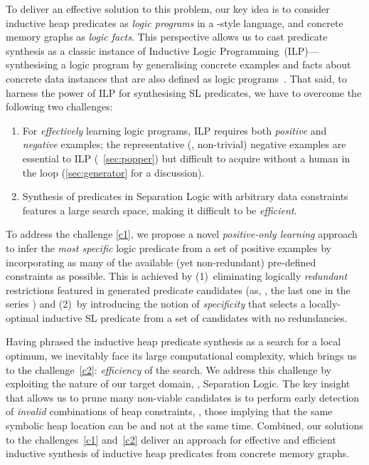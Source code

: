 To deliver an effective solution to this problem, our key idea is to
consider inductive heap predicates as \emph{logic programs} in a
\prolog-style language, and concrete memory graphs as \emph{logic
  facts}.
%
This perspective allows us to cast predicate synthesis as a classic
instance of Inductive Logic Programming~(ILP)---synthesising a logic
program by generalising concrete examples and facts about concrete
data instances that are also defined as logic
programs~\cite{Muggleton91,CropperDEM22}.
%
That said, to harness the power of ILP for synthesising SL predicates,
we have to overcome the following two challenges:

\begin{enumerate}[label=\textbf{C\arabic*},topsep=2pt,leftmargin=17pt]
%
\item \label{c1} For \emph{effectively} learning logic programs, ILP
  requires both \emph{positive} and \emph{negative} examples; the
  representative (\ie, non-trivial) negative examples are essential to
  ILP (\cf~\autoref{sec:popper}) but difficult to acquire without a
  human in the loop (\cf \autoref{sec:generator} for a discussion).
%
\item \label{c2} Synthesis of predicates in Separation Logic with
  arbitrary data constraints features a large search space, making it
  difficult to be \emph{efficient}.
%
\end{enumerate}

\noindent
%
To address the challenge \ref{c1}, we propose a novel
\textit{positive-only learning} approach to infer the \emph{most
  specific} logic predicate from a set of positive examples by
incorporating as many of the available (yet non-redundant) pre-defined
constraints as possible.
%
This is achieved by (1)~eliminating logically \emph{redundant}
restrictions featured in generated predicate candidates (as, \eg, the
last one in the series ) and
%
(2)~by introducing the notion of \emph{specificity} that selects a
locally-optimal inductive SL predicate from a set
of candidates with no redundancies.

Having phrased the inductive heap predicate synthesis as a search
for a local optimum, we inevitably face its large
computational complexity, which brings us to the challenge~\ref{c2}:
\emph{efficiency} of the search.
%
We address this challenge by exploiting the nature of our target
domain, \ie, Separation Logic. The key insight that allows us to prune
many non-viable candidates is to perform early detection of
\emph{invalid} combinations of heap constraints, \eg, those implying
that the same symbolic heap location can be  and not
 at the same time.
%
Combined, our solutions to the challenges~\ref{c1} and~\ref{c2}
deliver an approach for effective and efficient inductive synthesis of
inductive heap predicates from concrete memory graphs.

